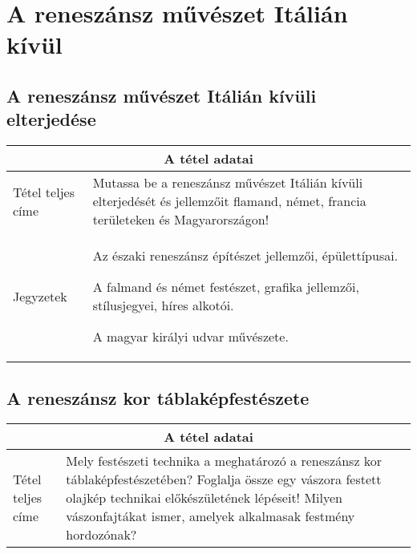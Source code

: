 \chapter{A reneszánsz művészet Itálián kívül} %
\label{ch:9_reneszansz_italian_kivul}

\section{A reneszánsz művészet Itálián kívüli elterjedése}

\begin{center}
	\begin{longtable}{ | p{} | p{} | }
		
		\hline
		\multicolumn{2}{|c|}{\textbf{A tétel adatai}}
		\\ \hline
		
		\hline
		Tétel teljes címe
		&
		Mutassa be a reneszánsz művészet Itálián kívüli elterjedését és jellemzőit flamand, német, francia területeken és Magyarországon!
		\\ \hline
		
		Jegyzetek &
		\begin{compactitem}
			\item Az északi reneszánsz építészet jellemzői, épülettípusai.
			\item A falmand és német festészet, grafika jellemzői, stílusjegyei, híres alkotói.
			\item A magyar királyi udvar művészete.
		\end{compactitem}
		\\\hline
		
	\end{longtable}
\end{center}

\cleardoublepage


\section{A reneszánsz kor táblaképfestészete}

\begin{center}
	\begin{longtable}{ | p{} | p{} | }
		
		\hline
		\multicolumn{2}{|c|}{\textbf{A tétel adatai}}
		\\ \hline
		
		\hline
		Tétel teljes címe 
		&
		Mely festészeti technika a meghatározó a reneszánsz kor táblaképfestészetében? Foglalja össze egy vászora festett olajkép technikai előkészületének lépéseit! Milyen vászonfajtákat ismer, amelyek alkalmasak festmény hordozónak?
		\\ \hline
		
	\end{longtable}
\end{center}
